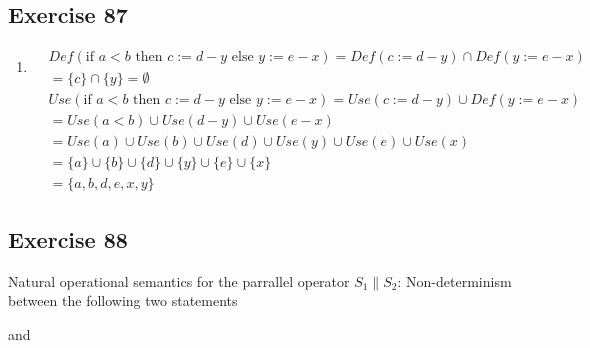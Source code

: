 \documentclass[12pt,fleqn]{article}		%
\begin{document}
\subsection{Exercise 87}
\begin{enumerate}
\item 
\begin{align*}
&Def(\text{if }a<b\text{ then }c:=d-y\text{ else }y:=e-x) = Def(c:=d-y) \cap Def(y:=e-x)\\
&= \{c\} \cap \{y\} = \emptyset
\end{align*}
\begin{align*}
&Use(\text{if }a<b\text{ then }c:=d-y\text{ else }y:=e-x) = Use(c:=d-y) \cup Def(y:=e-x)\\
&= Use(a < b) \cup Use(d-y) \cup Use(e-x)\\
&= Use(a) \cup Use(b) \cup Use(d) \cup Use(y) \cup Use(e) \cup Use(x)\\
&= \{a\} \cup \{b\} \cup \{d\} \cup \{y\} \cup \{e\} \cup \{x\}\\
&= \{a, b, d, e, x, y\}
\end{align*}
\end{enumerate}

\subsection{Exercise 88}
Natural operational semantics for the parrallel operator $ S_1 \parallel S_2 $:
Non-determinism between the following two statements
\begin{prooftree}
\end{prooftree}
and
\begin{prooftree}
\end{prooftree}
\end{document}
